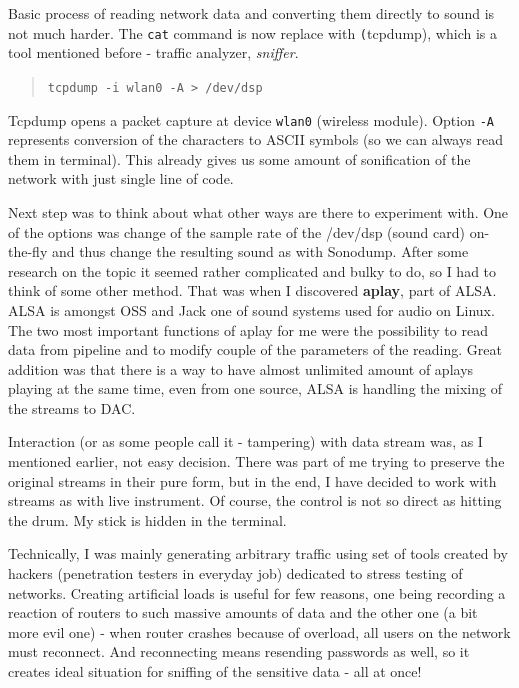 \documentclass[12pt,a4paper,oneside]{report}
\begin{document}
Basic process of reading network data and converting them directly to sound is not much harder. The \texttt{cat} command is now replace with \texttt(tcpdump), which is a tool mentioned before - traffic analyzer, \emph{sniffer}.
\begin{quotation}
	\texttt{tcpdump -i wlan0 -A > /dev/dsp} 
\end{quotation}

Tcpdump opens a packet capture at device \texttt{wlan0} (wireless module). Option \texttt{-A} represents conversion of the characters to ASCII symbols (so we can always read them in terminal). This already gives us some amount of sonification of the network with just single line of code. 

Next step was to think about what other ways are there to experiment with. One of the options was change of the sample rate of the /dev/dsp (sound card) on-the-fly and thus change the resulting sound as with Sonodump. After some research on the topic it seemed rather complicated and bulky to do, so I had to think of some other method. That was when I discovered \textbf{aplay}, part of ALSA. ALSA is amongst OSS and Jack one of sound systems used for audio on Linux. The two most important functions of aplay for me were the possibility to read data from pipeline and to modify couple of the parameters of the reading. Great addition was that there is a way to have almost unlimited amount of aplays playing at the same time, even from one source, ALSA is handling the mixing of the streams to DAC.

Interaction (or as some people call it - tampering) with data stream was, as I mentioned earlier, not easy decision. There was part of me trying to preserve the original streams in their pure form, but in the end, I have decided to work with streams as with live instrument. Of course, the control is not so direct as hitting the drum. My stick is hidden in the terminal. 

Technically, I was mainly generating arbitrary traffic using set of tools created by hackers (penetration testers in everyday job) dedicated to stress testing of networks. Creating artificial loads is useful for few reasons, one being recording a reaction of routers to such massive amounts of data and the other one (a bit more evil one) - when router crashes because of overload, all users on the network must reconnect. And reconnecting means resending passwords as well, so it creates ideal situation for sniffing of the sensitive data - all at once!
\end{document}
